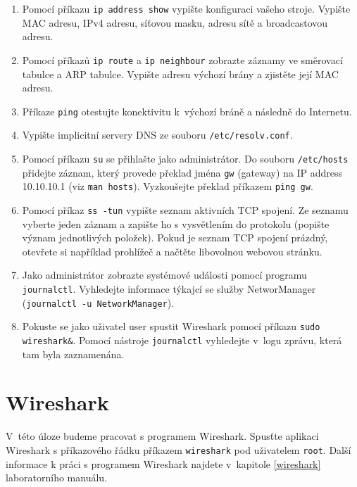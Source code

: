 \documentclass[a4paper,11pt]{article}
\begin{document}
\begin{enumerate}
  \item Pomocí příkazu {\tt ip address show} vypište konfiguraci vašeho stroje. Vypište MAC adresu, IPv4 adresu, síťovou masku, adresu sítě a broadcastovou adresu.
  \item Pomocí příkazů {\tt ip route} a {\tt ip neighbour} zobrazte záznamy ve směrovací tabulce a ARP tabulce. Vypište adresu výchozí brány a zjistěte její MAC adresu. 
  \item Příkaze {\tt ping} otestujte konektivitu k~výchozí bráně a následně do Internetu. 
  \item Vypište implicitní servery DNS ze souboru {\tt /etc/resolv.conf}.
  \item Pomocí příkazu {\tt su} se přihlašte jako administrátor. Do souboru {\tt /etc/hosts} přidejte záznam, který provede překlad jména {\tt gw} (gateway) na IP address 10.10.10.1 (viz {\tt man hosts}). Vyzkoušejte překlad příkazem {\tt ping gw}. 
  \item Pomocí příkaz {\tt ss -tun} vypište seznam aktivních TCP spojení. Ze seznamu vyberte jeden záznam a zapište ho s vysvětlením do protokolu (popište význam jednotlivých položek). Pokud je seznam TCP spojení prázdný, otevřete si například prohlížeč a načtěte libovolnou webovou stránku. 
  \item Jako administrátor zobrazte systémové události pomocí programu \texttt{journalctl}. Vyhledejte informace týkajcí se služby NetworManager ({\tt journalctl -u NetworkManager}).  
  \item Pokuste se jako uživatel user spustit Wireshark pomocí příkazu \texttt{sudo wireshark\&}. Pomocí nástroje {\tt journalctl} vyhledejte v~logu zprávu, která tam byla zaznamenána.
\end{enumerate}

\section{Wireshark}
V~této úloze budeme pracovat s programem Wireshark. Spusťte aplikaci Wireshark s příkazového řádku příkazem \texttt{wireshark}
pod uživatelem \texttt{root}. Další informace k práci s programem Wireshark najdete v~kapitole \ref{wireshark} laboratorního manuálu. 
\end{document}
